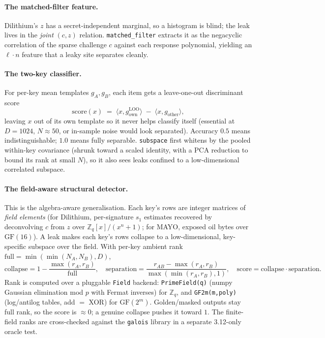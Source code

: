 \documentclass[11pt]{article}
\newcommand{\code}[1]{\texttt{#1}}
\newcommand{\Zq}{\ensuremath{\mathbb{Z}_q}}
\newcommand{\GF}[1]{\ensuremath{\mathrm{GF}(#1)}}
\begin{document}
\paragraph{The matched-filter feature.} Dilithium's $z$ has a secret-independent
marginal, so a histogram is blind; the leak lives in the \emph{joint} $(c,z)$
relation. \code{matched\_filter} extracts it as the negacyclic correlation of the
sparse challenge $c$ against each response polynomial, yielding an $\ell\!\cdot\!n$
feature that a leaky site separates cleanly.

\paragraph{The two-key classifier.} For per-key mean templates $g_A,g_B$, each item
gets a leave-one-out discriminant score
\[
  \mathrm{score}(x) \;=\; \langle x, g^{\text{LOO}}_{\text{own}}\rangle
                      \;-\; \langle x, g_{\text{other}}\rangle ,
\]
leaving $x$ out of its own template so it never helps classify itself (essential at
$D\!=\!1024$, $N\!\approx\!50$, or in-sample noise would look separated). Accuracy
$0.5$ means indistinguishable; $1.0$ means fully separable. \code{subspace} first
whitens by the pooled within-key covariance (shrunk toward a scaled identity, with
a PCA reduction to bound its rank at small $N$), so it also sees leaks confined to a
low-dimensional correlated subspace.

\paragraph{The field-aware structural detector.} This is the algebra-aware
generalisation. Each key's rows are integer matrices of \emph{field elements} (for
Dilithium, per-signature $s_1$ estimates recovered by deconvolving $c$ from $z$ over
$\Zq[x]/(x^n+1)$; for MAYO, exposed oil bytes over \GF{16}). A leak makes each key's
rows collapse to a low-dimensional, key-specific subspace over the field. With
per-key ambient rank $\mathrm{full}=\min(\min(N_A,N_B),D)$,
\[
  \text{collapse}=1-\frac{\max(r_A,r_B)}{\mathrm{full}},\quad
  \text{separation}=\frac{r_{AB}-\max(r_A,r_B)}{\max(\min(r_A,r_B),1)},\quad
  \text{score}=\text{collapse}\cdot\text{separation}.
\]
Rank is computed over a pluggable \code{Field} backend: \code{PrimeField(q)} (numpy
Gaussian elimination mod $p$ with Fermat inverses) for \Zq, and \code{GF2m(m,poly)}
(log/antilog tables, add $=$ XOR) for \GF{2^m}. Golden/masked outputs stay full
rank, so the score is $\approx 0$; a genuine collapse pushes it toward $1$. The
finite-field ranks are cross-checked against the \code{galois} library in a
separate 3.12-only oracle test.
\end{document}
